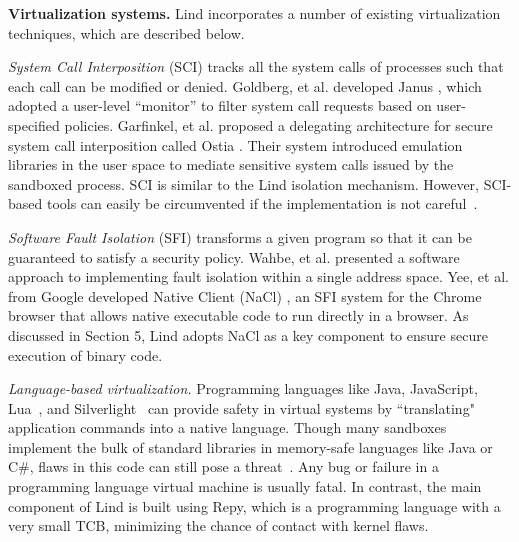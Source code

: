 
\textbf{Virtualization systems.}
Lind incorporates a number of existing virtualization techniques, which are
described below.

\textit{System Call Interposition} (SCI) tracks all the system calls of processes such
that each call can be modified or denied.
Goldberg, et al. developed Janus \cite{Janus0:96, Janus:99},
which adopted a user-level ``monitor'' to filter system call requests based on
user-specified policies. Garfinkel, et al. proposed a delegating architecture for secure system call interposition
called Ostia \cite{SCI-04}. Their system introduced emulation libraries in the user space
to mediate sensitive system calls issued by the sandboxed process. SCI is similar to
 the Lind isolation mechanism. However, SCI-based tools can easily be circumvented
 if the implementation is not careful~\cite{Problems-SCI}.

\textit{Software Fault Isolation} (SFI) transforms a given program so that it can be guaranteed to satisfy a security policy.
Wahbe, et al. \cite{SFI:93} presented a software approach to implementing
fault isolation within a single address space.
Yee, et al. from Google developed Native Client (NaCl) \cite{NaCl-09},
an SFI system for the Chrome browser that allows native executable code to run directly in a
browser. As discussed in Section 5, Lind adopts NaCl as a key component to ensure secure execution
of binary code.

\textit{Language-based virtualization.}
Programming languages like Java, JavaScript, Lua~\cite{Lua}, and
Silverlight~\cite{Silverlight} can provide safety in virtual systems by
``translating" application commands into a native language.
%
Though many sandboxes implement the bulk of standard libraries in
memory-safe languages like Java or C\#, flaws in this code can
still pose a threat~\cite{JavaBugs, Java-Lessons}.
Any bug or failure in a programming language virtual
machine is usually fatal. In contrast, the main component of Lind
is built using Repy, which is a programming language with a very small TCB, minimizing the chance of contact with kernel flaws.

